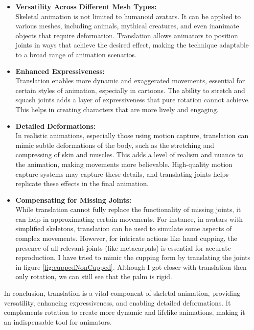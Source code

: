 \documentclass{uva-inf-article}
\begin{document}
\begin{itemize}
    \item \textbf{Versatility Across Different Mesh Types:}\\
Skeletal animation is not limited to humanoid avatars. It can be applied to various meshes, including animals, mythical creatures, and even inanimate objects that require deformation. Translation allows animators to position joints in ways that achieve the desired effect, making the technique adaptable to a broad range of animation scenarios.

    \item \textbf{Enhanced Expressiveness:}\\
Translation enables more dynamic and exaggerated movements, essential for certain styles of animation, especially in cartoons. The ability to stretch and squash joints adds a layer of expressiveness that pure rotation cannot achieve. This helps in creating characters that are more lively and engaging.

    \item \textbf{Detailed Deformations:}\\
In realistic animations, especially those using motion capture, translation can mimic subtle deformations of the body, such as the stretching and compressing of skin and muscles. This adds a level of realism and nuance to the animation, making movements more believable. High-quality motion capture systems may capture these details, and translating joints helps replicate these effects in the final animation.

    \item \textbf{Compensating for Missing Joints:}\\
While translation cannot fully replace the functionality of missing joints, it can help in approximating certain movements. For instance, in avatars with simplified skeletons, translation can be used to simulate some aspects of complex movements. However, for intricate actions like hand cupping, the presence of all relevant joints (like metacarpals) is essential for accurate reproduction. I have tried to mimic the cupping form by translating the joints in figure \ref{fig:cuppedNonCupped}. Although I got closer with translation then only rotation, we can still see that the palm is rigid.
\end{itemize}

In conclusion, translation is a vital component of skeletal animation, providing versatility, enhancing expressiveness, and enabling detailed deformations. It complements rotation to create more dynamic and lifelike animations, making it an indispensable tool for animators.
\end{document}
